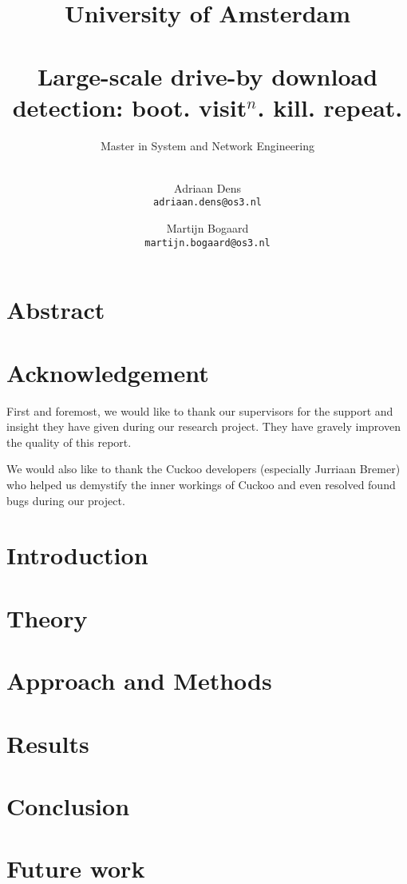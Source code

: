 \documentclass{scrartcl}
\title{University of Amsterdam \\[1cm] \horizontalrule{1pt}\\[0.5cm]Large-scale drive-by download detection: boot. visit$^n$. kill. repeat.}
\subtitle{Master in System and Network Engineering \\[0.5cm] \horizontalrule{1pt} \\[10cm] }
\author{
  Adriaan Dens\\
   \texttt{adriaan.dens@os3.nl}
  \and
  Martijn Bogaard\\
   \texttt{martijn.bogaard@os3.nl}
}
\begin{document}

\maketitle

\clearpage

\section*{Abstract}

\clearpage

\section*{Acknowledgement}

First and foremost, we would like to thank our supervisors for the support and insight they have given during our research project. They have gravely improven the quality of this report.

We would also like to thank the Cuckoo developers (especially Jurriaan Bremer) who helped us demystify the inner workings of Cuckoo and even resolved found bugs during our project.



\clearpage

\tableofcontents

\clearpage


\section{Introduction}


\clearpage

\section{Theory}


\clearpage

\section{Approach and Methods}


\clearpage

\section{Results}


\clearpage

\section{Conclusion}


\clearpage

\section{Future work}


\clearpage



\end{document}
